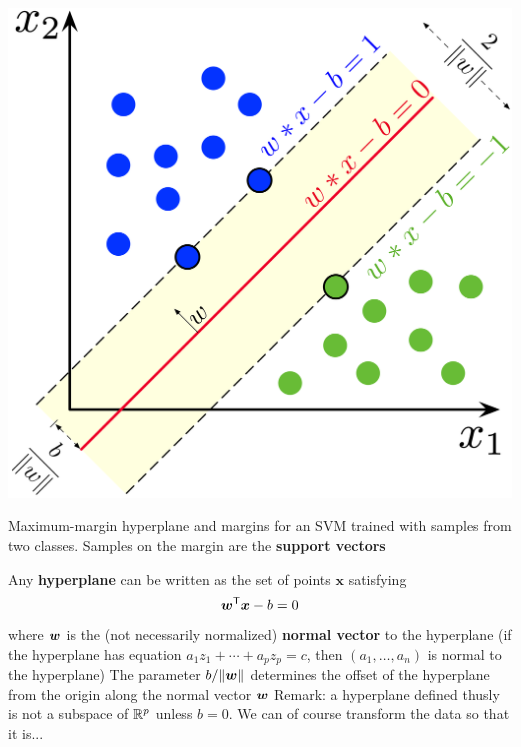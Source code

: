 \documentclass[aspectratio=169]{beamer}\usepackage[]{graphicx}\usepackage[]{xcolor}
\begin{document}
\begin{frame}
    \begin{minipage}{0.7\textwidth}
        \includegraphics[height=\textheight]{FIGS_slides/SVM_margin}
    \end{minipage}
    \begin{minipage}{0.28\textwidth}
        Maximum-margin hyperplane and margins for an SVM trained with samples from two classes. Samples on the margin are the \textbf{support vectors}
    \end{minipage}
\end{frame}

\begin{frame}
    Any \textbf{hyperplane} can be written as the set of points $\mathbf{x}$ satisfying
    \[
        \bm{w}^\mathsf{T} \bm{x} - b = 0
    \]
    where $\bm{w}$ is the (not necessarily normalized) \textbf{normal vector} to the hyperplane (if the hyperplane has equation $a_1z_1+\cdots+a_pz_p=c$, then $(a_1,\ldots,a_n)$ is normal to the hyperplane)
    \vfill
    The parameter $b/\|\bm{w}\|$ determines the offset of the hyperplane from the origin along the normal vector $\bm{w}$
    \vfill
    Remark: a hyperplane defined thusly is not a subspace of $\mathbb{R}^p$ unless $b=0$. We can of course transform the data so that it is...
\end{frame}
\end{document}
